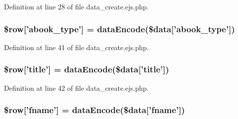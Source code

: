 \-Definition at line 28 of file data\-\_\-create.\-ejs.\-php.

\hypertarget{miscellaneous_2mysettings_2data__create_8ejs_8php_a0d1b6e8abe038ac8d97ac3bcaffc1aec}{
\subsubsection[{\$row}]{\setlength{\rightskip}{0pt plus 5cm}\$row\mbox{[}'abook\-\_\-type'\mbox{]} = {\bf data\-Encode}(\$data\mbox{[}'abook\-\_\-type'\mbox{]})}}\label{miscellaneous_2mysettings_2data__create_8ejs_8php_a0d1b6e8abe038ac8d97ac3bcaffc1aec}


\-Definition at line 41 of file data\-\_\-create.\-ejs.\-php.

\hypertarget{miscellaneous_2mysettings_2data__create_8ejs_8php_a70d36cba6a35524466f2a4c8112c8e4e}{
\subsubsection[{\$row}]{\setlength{\rightskip}{0pt plus 5cm}\$row\mbox{[}'title'\mbox{]} = {\bf data\-Encode}(\$data\mbox{[}'title'\mbox{]})}}\label{miscellaneous_2mysettings_2data__create_8ejs_8php_a70d36cba6a35524466f2a4c8112c8e4e}


\-Definition at line 42 of file data\-\_\-create.\-ejs.\-php.

\hypertarget{miscellaneous_2mysettings_2data__create_8ejs_8php_a5e241e1f48972b6bd961b356bd5b0b66}{
\subsubsection[{\$row}]{\setlength{\rightskip}{0pt plus 5cm}\$row\mbox{[}'fname'\mbox{]} = {\bf data\-Encode}(\$data\mbox{[}'fname'\mbox{]})}}\label{miscellaneous_2mysettings_2data__create_8ejs_8php_a5e241e1f48972b6bd961b356bd5b0b66}


